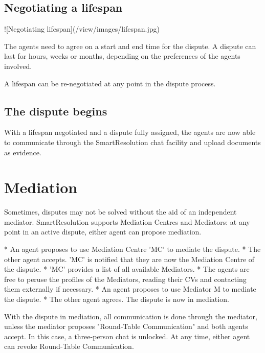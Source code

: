 \subsection{Negotiating a lifespan}

![Negotiating lifespan](/view/images/lifespan.jpg)

The agents need to agree on a start and end time for the dispute. A dispute can last for hours, weeks or months, depending on the preferences of the agents involved.

A lifespan can be re-negotiated at any point in the dispute process.

\subsection{The dispute begins}


With a lifespan negotiated and a dispute fully assigned, the agents are now able to communicate through the SmartResolution chat facility and upload documents as evidence.

\section{Mediation}

Sometimes, disputes may not be solved without the aid of an independent mediator. SmartResolution supports Mediation Centres and Mediators: at any point in an active dispute, either agent can propose mediation.


* An agent proposes to use Mediation Centre 'MC' to mediate the dispute.
* The other agent accepts. 'MC' is notified that they are now the Mediation Centre of the dispute.
* 'MC' provides a list of all available Mediators.
* The agents are free to peruse the profiles of the Mediators, reading their CVs and contacting them externally if necessary.
* An agent proposes to use Mediator M to mediate the dispute.
* The other agent agrees. The dispute is now in mediation.


With the dispute in mediation, all communication is done through the mediator, unless the mediator proposes "Round-Table Communication" and both agents accept. In this case, a three-person chat is unlocked. At any time, either agent can revoke Round-Table Communication.

